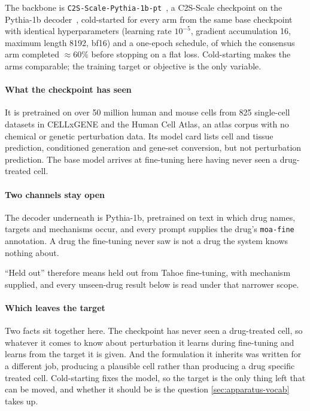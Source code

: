 The backbone is \texttt{C2S-Scale-Pythia-1b-pt}~\cite{c2sscale}, a C2S-Scale
checkpoint on the Pythia-1b decoder~\cite{pythia}, cold-started for every arm
from the same base checkpoint with identical hyperparameters (learning rate $10^{-5}$, gradient accumulation 16, maximum length 8192, bf16) and a one-epoch schedule, of which the consensus arm completed $\approx 60\%$ before stopping on a flat loss. Cold-starting
makes the arms comparable; the training target or objective is the only
variable.

\paragraph{What the checkpoint has seen} It is pretrained on over 50 million
human and mouse cells from 825 single-cell datasets in CELLxGENE and the Human
Cell Atlas, an atlas corpus with no chemical or genetic perturbation data. Its
model card lists cell and tissue prediction, conditioned generation and gene-set
conversion, but not perturbation prediction. The base model arrives at
fine-tuning here having never seen a drug-treated cell.

\paragraph{Two channels stay open} The decoder underneath is Pythia-1b,
pretrained on text in which drug names, targets and mechanisms occur, and every
prompt supplies the drug's \texttt{moa-fine} annotation. A drug the fine-tuning
never saw is not a drug the system knows nothing about.

\begin{scopelimit}
``Held out'' therefore means held out from Tahoe fine-tuning, with mechanism
supplied, and every unseen-drug result below is read under that narrower scope.
\end{scopelimit}

\paragraph{Which leaves the target} Two facts sit together here. The checkpoint
has never seen a drug-treated cell, so whatever it comes to know about
perturbation it learns during fine-tuning and learns from the target it is given.
And the formulation it inherits was written for a different job, producing a
plausible cell rather than producing a drug specific treated cell. Cold-starting
fixes the model, so the target is the only thing left that can be moved, and
whether it should be is the question \cref{sec:apparatus-vocab} takes up.

